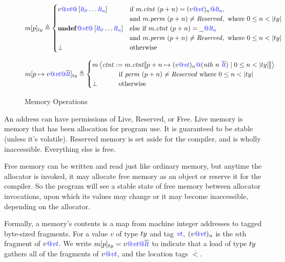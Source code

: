 \documentclass{llncs}
\begin{document}
\begin{figure}[t]
  \[\mem[p]_{\type} \triangleq
  \begin{cases}
    v\tagat\vt\tagat\left[\lt[_0]\dots\lt[_n]\right] & \textnormal{if } \mem.\contents ~ (p+n) = (v\tagat\vt)_n\tagat\lt[_n], \\
    & \textnormal{and } \mem.\mathit{perm} ~ (p+n) \not = \mathit{Reserved}, \textnormal{ where } 0 \leq n < |\type| \\
    \vundef\tagat\vt\tagat\left[\lt[_0]\dots\lt[_n]\right] & \textnormal{else if } \mem.\contents ~ (p+n) = \underline{~~}\tagat\lt[_n] \\
    & \textnormal{and } \mem.\mathit{perm} ~ (p+n) \not = \mathit{Reserved}, \textnormal{ where } 0 \leq n < |\type| \\
    \bot & \textnormal{otherwise}
  \end{cases}\]

  \[\mem[p \mapsto v\tagat\vt\tagat\overline{\lt}]_{\type} \triangleq
  \begin{cases}
    \mem\left\langle\contents := \mem.\contents\llbracket p + n \mapsto (v\tagat\vt)_n\tagat(\mathit{nth} ~ n ~ \overline{\lt}) \mid 0 \leq n < |\type| \rrbracket \right\rangle \\ \hspace{4em} \textnormal{if } \mathit{perm} ~ (p+n) \not = \mathit{Reserved} \textnormal{ where } 0 \leq n < |\type| \\
    \bot \hspace{3.2em} \textnormal{otherwise} \\
  \end{cases}\]
  
  \caption{Memory Operations}
  \label{fig:memops}
\end{figure}

An address can have permissions of Live, Reserved, or Free. Live memory
is memory that has been allocation for program use. It is guaranteed to be
stable (unless it's volatile). Reserved memory is set aside for the compiler,
and is wholly inaccessible. Everything else is free.

Free memory can be written and read just like ordinary memory, but anytime the
allocator is invoked, it may allocate free memory as an object or reserve it for
the compiler. So the program will see a stable state of free memory
between allocator invocations, upon which its values may change or it
may become inaccessible, depending on the allocator.

Formally, a memory's contents is a map from machine integer addresses to tagged
byte-sized fragments. For a value \(v\) of type \(\type\) and tag \(\vt\),
\((v\tagat\vt)_n\) is the \(n\)th fragment of \(v\tagat\vt\). We write
\(\mem[p]_{\type} = v\tagat\vt\tagat\overline{\lt}\) to indicate that a load
of type \(\type\) gathers all of the fragments of \(v\tagat\vt\), and the
location tags \(\overline{\lt}\).
\end{document}
